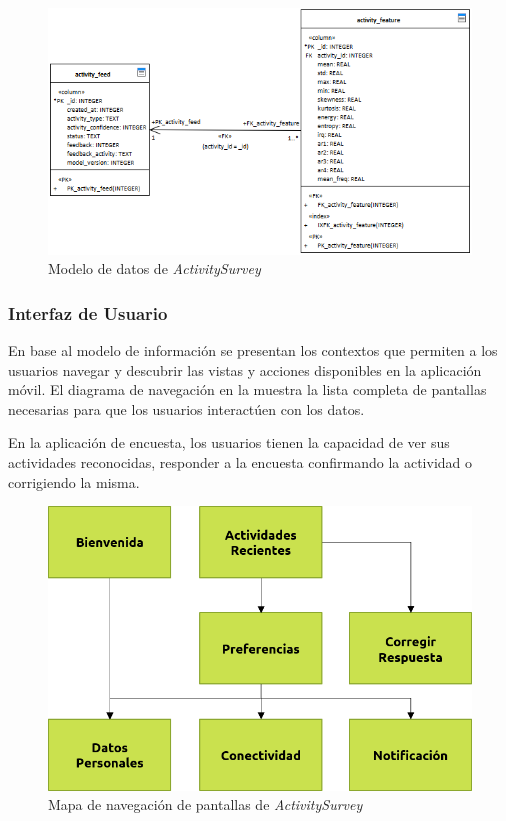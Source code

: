 \begin{figure}[H]
\begin{centering}
\includegraphics[width=1\columnwidth]{capitulo-5/graphics/act_surv_er}
\par\end{centering}
\caption[Modelo de datos de ActivitySurvey]{\label{fig5:act-surv-er}Modelo de datos de \emph{ActivitySurvey}}
\end{figure}


\subsubsection{Interfaz de Usuario}

En base al modelo de información se presentan los contextos que permiten
a los usuarios navegar y descubrir las vistas y acciones disponibles
en la aplicación móvil. El diagrama de navegación en la 
muestra la lista completa de pantallas necesarias para que los usuarios
interactúen con los datos. 

En la aplicación de encuesta, los usuarios tienen la capacidad de
ver sus actividades reconocidas, responder a la encuesta confirmando
la actividad o corrigiendo la misma. 

\begin{figure}[H]
\begin{centering}
\includegraphics[width=0.7\columnwidth]{capitulo-5/graphics/navegacion}
\par\end{centering}
\caption[Mapa de navegación de pantallas de ActivitySurvey]{\label{fig5:navega}Mapa de navegación de pantallas de \emph{ActivitySurvey}}

\end{figure}

